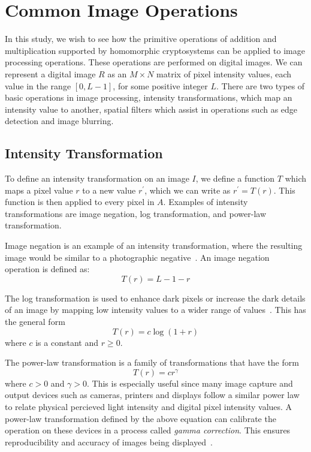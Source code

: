 \section{Common Image Operations}
In this study, we wish to see how the primitive operations of addition and multiplication supported by homomorphic cryptosystems can be applied to image processing operations. These operations are performed on digital images. We can represent a digital image $R$ as an $M \times N$ matrix of pixel intensity values, each value in the range $\left[0, L-1\right]$, for some positive integer $L$. There are two types of basic operations in image processing, intensity transformations, which map an intensity value to another, spatial filters which assist in operations such as edge detection and image blurring.

\subsection{Intensity Transformation}
To define an intensity transformation on an image $I$, we define a function $T$ which maps a pixel value $r$ to a new value $r^\prime$, which we can write as $r^\prime = T\left(r\right)$. This function is then applied to every pixel in $A$. Examples of intensity transformations are image negation, log transformation, and power-law transformation.

Image negation is an example of an intensity transformation, where the resulting image would be similar to a photographic negative~\cite{gonzalez_digital_2008}. An image negation operation is defined as:
\begin{equation}
    T\left(r\right) = L-1-r
\end{equation}

The log transformation is used to enhance dark pixels or increase the dark details of an image by mapping low intensity values to a wider range of values~\cite{gonzalez_digital_2008}. This has the general form
\begin{equation}
    T\left(r\right) = c \log\left(1 + r\right)
\end{equation}
where $c$ is a constant and $r \ge 0$.

The power-law transformation is a family of transformations that have the form
\begin{equation}
    T\left(r\right) = c r^{\gamma}
\end{equation}
where $c>0$ and $\gamma > 0$. This is especially useful since many image capture and output devices such as cameras, printers and displays follow a similar power law to relate physical percieved light intensity and digital pixel intensity values. A power-law transformation defined by the above equation can calibrate the operation on these devices in a process called \textit{gamma correction}. This ensures reproducibility and accuracy of images being displayed~\cite{gonzalez_digital_2008}.

